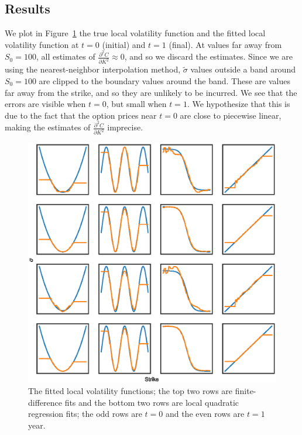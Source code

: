 \documentclass[11pt]{article}
\numberwithin{equation}{section}
\newcommand{\diff}[2]{\frac{\partial #1}{\partial #2}}
\begin{document}
\subsection{Results}
We plot in Figure~\ref{fig:fits} the true local volatility function and the
fitted local volatility function at $t=0$ (initial) and $t=1$ (final). At values
far away from $S_0 = 100$, all estimates of $\diff{^2C}{K^2} \approx 0$, and so
we discard the estimates. Since we are using the nearest-neighbor interpolation
method, $\tilde\sigma$ values outside a band around $S_0 = 100$ are clipped to
the boundary values around the band. These are values far away from the strike,
and so they are unlikely to be incurred. We see that the errors are visible when
$t = 0$, but small when $t=1$. We hypothesize that this is due to the fact that
the option prices near $t=0$ are close to piecewise linear, making the estimates
of $\diff{^2C}{K^2}$ imprecise.
 
\begin{figure}[h!]
  \centering
  \includegraphics[width=\textwidth]{figs/fits.eps}
  \caption{The fitted local volatility functions; the top two rows are
finite-difference fits and the bottom two rows are local quadratic regression
fits; the odd rows are $t=0$ and the even rows are $t=1$ year.}
  \label{fig:fits}
\end{figure}
\end{document}
